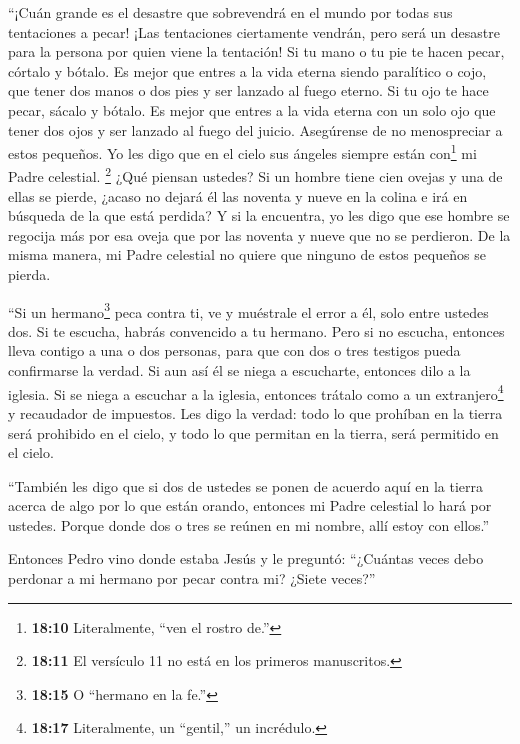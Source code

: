  ``¡Cuán grande es el desastre que sobrevendrá en el mundo
por todas sus tentaciones a pecar! ¡Las tentaciones ciertamente vendrán,
pero será un desastre para la persona por quien viene la tentación!
 Si tu mano o tu pie te hacen pecar, córtalo y bótalo. Es
mejor que entres a la vida eterna siendo paralítico o cojo, que tener
dos manos o dos pies y ser lanzado al fuego eterno.  Si tu
ojo te hace pecar, sácalo y bótalo. Es mejor que entres a la vida eterna
con un solo ojo que tener dos ojos y ser lanzado al fuego del juicio.
 Asegúrense de no menospreciar a estos pequeños. Yo les
digo que en el cielo sus ángeles siempre están con\footnote{\textbf{18:10}
  Literalmente, ``ven el rostro de.''} mi Padre celestial. 
\footnote{\textbf{18:11} El versículo 11 no está en los primeros
  manuscritos.}  ¿Qué piensan ustedes? Si un hombre tiene
cien ovejas y una de ellas se pierde, ¿acaso no dejará él las noventa y
nueve en la colina e irá en búsqueda de la que está perdida?
 Y si la encuentra, yo les digo que ese hombre se regocija
más por esa oveja que por las noventa y nueve que no se perdieron.
 De la misma manera, mi Padre celestial no quiere que
ninguno de estos pequeños se pierda.

 ``Si un hermano\footnote{\textbf{18:15} O ``hermano en la
  fe.''} peca contra ti, ve y muéstrale el error a él, solo entre
ustedes dos. Si te escucha, habrás convencido a tu hermano.
 Pero si no escucha, entonces lleva contigo a una o dos
personas, para que con dos o tres testigos pueda confirmarse la verdad.
 Si aun así él se niega a escucharte, entonces dilo a la
iglesia. Si se niega a escuchar a la iglesia, entonces trátalo como a un
extranjero\footnote{\textbf{18:17} Literalmente, un ``gentil,'' un
  incrédulo.} y recaudador de impuestos.  Les digo la
verdad: todo lo que prohíban en la tierra será prohibido en el cielo, y
todo lo que permitan en la tierra, será permitido en el cielo.

 ``También les digo que si dos de ustedes se ponen de
acuerdo aquí en la tierra acerca de algo por lo que están orando,
entonces mi Padre celestial lo hará por ustedes.  Porque
donde dos o tres se reúnen en mi nombre, allí estoy con ellos.''

 Entonces Pedro vino donde estaba Jesús y le preguntó:
``¿Cuántas veces debo perdonar a mi hermano por pecar contra mi? ¿Siete
veces?''


